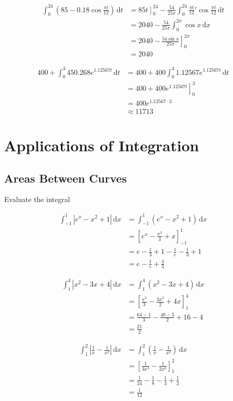 \documentclass[a4paper,12pt]{article}
\newcommand{\ud}{\,\mathrm{d}}
\begin{document}
\begin{align*}
   \int_0^{24}\left(85 - 0.18\cos\frac{\pi t}{12}\right)\ud t
&= \left.85t\right]_0^{24}
 - \frac{54}{25\pi}\int_0^{24}\frac{\pi t}{12}'\cos\frac{\pi t}{12}\ud t\\
&= 2040 - \frac{54}{25\pi}\int_0^{2\pi}\cos x \ud x\\
&= 2040 - \left.\frac{54\sin x}{25\pi}\right]_0^{2\pi}\\
&= 2040\tag{80}
\end{align*}

\begin{align*}
   400 + \int_0^3 450.268e^{1.12567t}\ud t
&= 400 + 400\int_0^3 1.12567e^{1.12567t}\ud t\\
&= 400 + \left.400e^{1.12567t}\right]_0^3\\
&= 400e^{1.12567 \cdot 3}\\
&\approx 11713\tag{82}
\end{align*}

\section{Applications of Integration}
\subsection{Areas Between Curves}
Evaluate the integral

\begin{align*}
  \int_{-1}^1\left|e^x - x^2 + 1\right|\ud x
&=\int_{-1}^1\left(e^x - x^2 + 1\right)\ud x\\
&=\left[e^x - \frac{x^3}{3} + x\right]_{-1}^1\\
&=e - \frac{1}{3} + 1 - \frac{1}{e} - \frac{1}{3} + 1\\
&=e - \frac{1}{e} + \frac{4}{3}\tag{5}
\end{align*}

\begin{align*}
  \int_1^4\left|x^2 - 3x + 4\right|\ud x
&=\int_1^4\left(x^2 - 3x + 4\right)\ud x\\
&=\left[\frac{x^3}{3} - \frac{3x^2}{2} + 4x\right]_1^4\\
&=\frac{64 - 1}{3} - \frac{48 - 3}{2} + 16 - 4\\
&=\frac{21}{2}\tag{7}
\end{align*}

\begin{align*}
  \int_1^2\left|\frac{1}{x} - \frac{1}{x^2}\right|\ud x
&=\int_1^2\left(\frac{1}{x} - \frac{1}{x^2}\right)\ud x\\
&=\left[\frac{1}{3x^3} - \frac{1}{2x^2}\right]_1^2\\
&=\frac{1}{24} - \frac{1}{8} - \frac{1}{3} + \frac{1}{2}\\
&=\frac{1}{12}\tag{9}
\end{align*}
\end{document}
